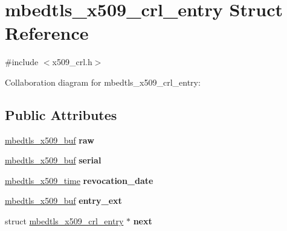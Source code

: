 \hypertarget{structmbedtls__x509__crl__entry}{}\section{mbedtls\+\_\+x509\+\_\+crl\+\_\+entry Struct Reference}
\label{structmbedtls__x509__crl__entry}


{\ttfamily \#include $<$x509\+\_\+crl.\+h$>$}



Collaboration diagram for mbedtls\+\_\+x509\+\_\+crl\+\_\+entry\+:
\subsection*{Public Attributes}
\begin{DoxyCompactItemize}
\item 
\mbox{\label{structmbedtls__x509__crl__entry_aa629ec226c2e624eb1bf72f4d5c2cc8d}} 
\mbox{\hyperlink{group__x509__module_ga4d02c9e8e4e2934555e0d132cd2976dc}{mbedtls\+\_\+x509\+\_\+buf}} {\bfseries raw}
\item 
\mbox{\label{structmbedtls__x509__crl__entry_a2cbc8acba11f2040948532389218741d}} 
\mbox{\hyperlink{group__x509__module_ga4d02c9e8e4e2934555e0d132cd2976dc}{mbedtls\+\_\+x509\+\_\+buf}} {\bfseries serial}
\item 
\mbox{\label{structmbedtls__x509__crl__entry_abb22e83d676a60bfd93bb6e3960daa3e}} 
\mbox{\hyperlink{structmbedtls__x509__time}{mbedtls\+\_\+x509\+\_\+time}} {\bfseries revocation\+\_\+date}
\item 
\mbox{\label{structmbedtls__x509__crl__entry_a5803a38521d5dbfd7240b364bde540a5}} 
\mbox{\hyperlink{group__x509__module_ga4d02c9e8e4e2934555e0d132cd2976dc}{mbedtls\+\_\+x509\+\_\+buf}} {\bfseries entry\+\_\+ext}
\item 
\mbox{\label{structmbedtls__x509__crl__entry_abb908815d7bcf91ff87992682efe33b0}} 
struct \mbox{\hyperlink{structmbedtls__x509__crl__entry}{mbedtls\+\_\+x509\+\_\+crl\+\_\+entry}} $\ast$ {\bfseries next}
\end{DoxyCompactItemize}


